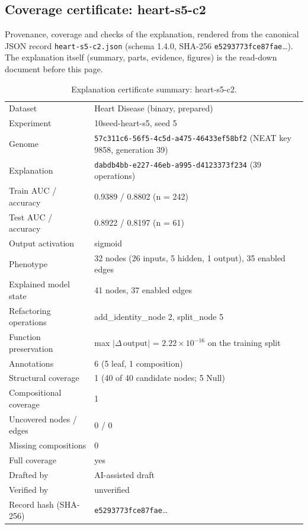 \providecommand{\explaneatcertdir}[1]{}
\begin{drafted}
\section{Coverage certificate: heart-s5-c2}\label{app:heart-s5-c2:sec}
Provenance, coverage and checks of the explanation, rendered from the canonical JSON record \texttt{heart-s5-c2.json} (schema 1.4.0, SHA-256 \texttt{e5293773fce87fae}\ldots). The explanation itself (summary, parts, evidence, figures) is the read-down document before this page.

\begin{table}[htbp]
\centering\small
\begin{tabularx}{\linewidth}{@{}lX@{}}
\toprule
Dataset & Heart Disease (binary, prepared) \\
Experiment & 10seed-heart-s5, seed 5 \\
Genome & \texttt{57c311c6-56f5-4c5d-a475-46433ef58bf2} (NEAT key 9858, generation 39) \\
Explanation & \texttt{dabdb4bb-e227-46eb-a995-d4123373f234} (39 operations) \\
Train AUC / accuracy & 0.9389 / 0.8802 (n = 242) \\
Test AUC / accuracy & 0.8922 / 0.8197 (n = 61) \\
Output activation & sigmoid \\
Phenotype & 32 nodes (26 inputs, 5 hidden, 1 output), 35 enabled edges \\
Explained model state & 41 nodes, 37 enabled edges \\
Refactoring operations & add\_\allowbreak{}identity\_\allowbreak{}node 2, split\_\allowbreak{}node 5 \\
Function preservation & max $|\Delta\,\mathrm{output}|$ = $2.22\times 10^{-16}$ on the training split \\
Annotations & 6 (5 leaf, 1 composition) \\
Structural coverage & 1 (40 of 40 candidate nodes; 5 Null) \\
Compositional coverage & 1 \\
Uncovered nodes / edges & 0 / 0 \\
Missing compositions & 0 \\
Full coverage & yes \\
Drafted by & AI-assisted draft \\
Verified by & unverified \\
Record hash (SHA-256) & \texttt{e5293773fce87fae}\ldots \\
\bottomrule
\end{tabularx}
\caption{Explanation certificate summary: heart-s5-c2.}
\label{app:heart-s5-c2:summary}
\end{table}

\end{drafted}
